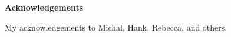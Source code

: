 \newpage
\thispagestyle{plain}
\begin{center}

\normalsize \textbf {Acknowledgements}
\end{center}


My acknowledgements to Michal, Hank, Rebecca, and others.

\newpage